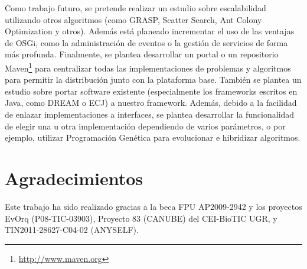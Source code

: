 \documentclass[runningheads]{llncs}
\begin{document}
Como trabajo futuro, se pretende realizar un estudio sobre escalabilidad utilizando otros algoritmos (como GRASP, Scatter Search, Ant Colony Optimization y otros). Además está planeado incrementar el uso de las ventajas de OSGi, como la administración de eventos o la gestión de servicios de forma más profunda. Finalmente, se plantea desarrollar un portal o un repositorio Maven\footnote{\url{http://www.maven.org}} para centralizar todas las implementaciones de problemas y algoritmos para permitir la distribución junto con la plataforma base. También se plantea un estudio sobre portar software existente (especialmente los frameworks escritos en Java, como DREAM o ECJ) a nuestro framework. Además, debido a la facilidad de enlazar implementaciones a interfaces, se plantea desarrollar la funcionalidad de elegir una u otra implementación dependiendo de varios parámetros, o por ejemplo, utilizar Programación Genética para evolucionar e hibridizar algoritmos.

\section{Agradecimientos}
Este trabajo ha sido realizado gracias a la beca FPU AP2009-2942 y los proyectos EvOrq (P08-TIC-03903), Proyecto 83 (CANUBE) del CEI-BioTIC UGR, y TIN2011-28627-C04-02 (ANYSELF).






\end{document}

